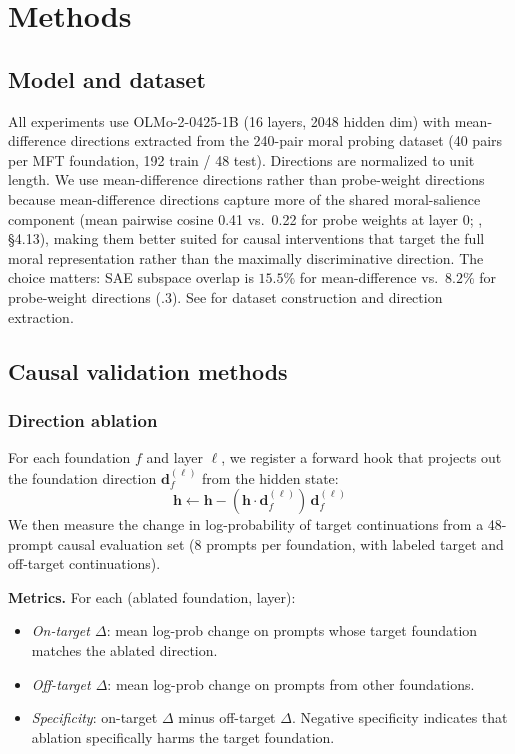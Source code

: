 \section{Methods}\label{methods}

\subsection{Model and dataset}\label{model-and-dataset}

All experiments use OLMo-2-0425-1B (16 layers, 2048 hidden dim) with mean-difference directions extracted from the 240-pair moral probing dataset (40 pairs per MFT foundation, 192 train / 48 test).
Directions are normalized to unit length.
We use mean-difference directions rather than probe-weight directions because mean-difference directions capture more of the shared moral-salience component (mean pairwise cosine 0.41 vs.~0.22 for probe weights at layer 0; \citealt{reblitzrichardson2026geometry}, \S4.13), making them better suited for causal interventions that target the full moral representation rather than the maximally discriminative direction.
The choice matters: SAE subspace overlap is \(15.5\%\) for mean-difference vs.~\(8.2\%\) for probe-weight directions (.3).
See \citet{reblitzrichardson2026geometry} for dataset construction and direction extraction.

\subsection{Causal validation methods}\label{causal-validation-methods}

\subsubsection{Direction ablation}\label{direction-ablation}

For each foundation \(f\) and layer \(\ell\), we register a forward hook that projects out the foundation direction \(\mathbf{d}_f^{(\ell)}\) from the hidden state:
\[\mathbf{h} \leftarrow \mathbf{h} - (\mathbf{h} \cdot \mathbf{d}_f^{(\ell)}) \, \mathbf{d}_f^{(\ell)}\]
We then measure the change in log-probability of target continuations from a 48-prompt causal evaluation set (8 prompts per foundation, with labeled target and off-target continuations).

\textbf{Metrics.} For each (ablated foundation, layer):

\begin{itemize}
\tightlist
\item
  \emph{On-target \(\Delta\)}: mean log-prob change on prompts whose target foundation matches the ablated direction.
\item
  \emph{Off-target \(\Delta\)}: mean log-prob change on prompts from other foundations.
\item
  \emph{Specificity}: on-target \(\Delta\) minus off-target \(\Delta\). Negative specificity indicates that ablation specifically harms the target foundation.
\end{itemize}

